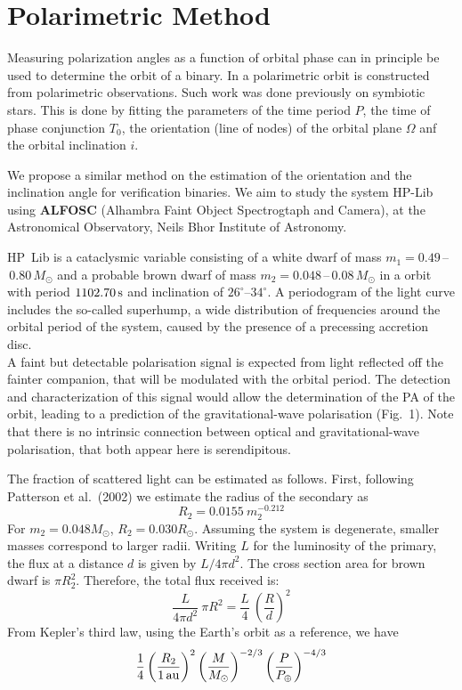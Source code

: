 \documentclass[12pt,a4paper,oneside]{book}
\begin{document}
\section*{Polarimetric Method}

Measuring polarization angles as a function of orbital phase can in principle be used to determine the orbit of a binary. In a polarimetric orbit is constructed from polarimetric observations. Such work was done previously on symbiotic stars. This is done by fitting the parameters of the time period $P$, the time of phase conjunction $T_{0}$, the orientation (line of nodes) of the orbital plane $\Omega$ anf the orbital inclination $i$. 

We propose a similar method on the estimation of the orientation and the inclination angle for verification binaries. We aim to study the system HP-Lib using \textbf{ALFOSC} (Alhambra Faint Object Spectrogtaph and Camera), at the Astronomical Observatory, Neils Bhor Institute of Astronomy.

HP~Lib is a cataclysmic variable consisting of a white dwarf of mass
$m_1=0.49\,$--$\,0.80\,M_\odot$ and a probable brown dwarf of mass
$m_2=0.048\,$--$\,0.08\,M_\odot$ in a orbit with period
$1102.70\rm\,s$ and inclination of $26^\circ$--$34^\circ$.  A
periodogram of the light curve includes the so-called superhump, a
wide distribution of frequencies around the orbital period of the
system, caused by the presence of a precessing accretion disc.\\

A faint but detectable polarisation signal is expected from light
reflected off the fainter companion, that will be modulated with the
orbital period. The detection and characterization of this signal
would allow the determination of the PA of the orbit, leading to a
prediction of the gravitational-wave polarisation (Fig.~1).  Note that there
is no intrinsic connection between optical and gravitational-wave
polarisation, that both appear here is serendipitous.

The fraction of scattered light can be estimated as follows.  First,
following Patterson et al.~(2002) we estimate the radius of the
secondary as
\begin{equation}
R_2 = 0.0155 \ m_2^{-0.212}
\end{equation}
For $m_2 = 0.048M_\odot$, $R_2 = 0.030R_\odot$.  Assuming the system
is degenerate, smaller masses correspond to larger radii.  Writing $L$
for the luminosity of the primary, the flux at a distance $d$ is given
by $L/4 \pi d^2$. The cross section area for brown dwarf is $\pi R_2^2$.
Therefore, the total flux received is:
\begin{equation}
\frac{L}{4 \pi d^2} \ \pi R^2 = \frac{L}{4} \ \left(\frac{R}{d}\right)^2
\end{equation}
From Kepler's third law, using the Earth's orbit as a reference, we have
\begin{equation}
  \frac{1}{4} \left(\frac{R_2}{\rm 1\,au}\right)^2
  \left(\frac{M}{M_{\odot}}\right)^{-2/3}
  \left(\frac{P}{P_{\oplus}}\right)^{-4/3}
\end{equation}
\end{document}
